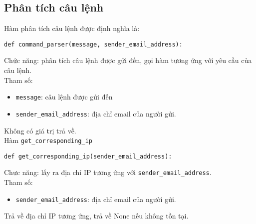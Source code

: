 \subsection{Phân tích câu lệnh}
Hàm phân tích câu lệnh được định nghĩa là:
\begin{lstlisting}
def command_parser(message, sender_email_address):
\end{lstlisting}
Chức năng: phân tích câu lệnh được gửi đến, gọi hàm tương ứng với yêu cầu của câu lệnh.\\
Tham số:
\begin{itemize}
\item \lstinline{message}: câu lệnh được gửi đến
\item \lstinline{sender_email_address}: địa chỉ email của người gửi.
\end{itemize}
Không có giá trị trả về.\\

Hàm \lstinline{get_corresponding_ip}
\begin{lstlisting}
def get_corresponding_ip(sender_email_address):
\end{lstlisting}
Chưc năng: lấy ra địa chỉ IP tương ứng với \lstinline{sender_email_address}.\\
Tham số:
\begin{itemize}
\item \lstinline{sender_email_address}: địa chỉ email của người gửi.
\end{itemize}
Trả về địa chỉ IP tương ứng, trả về None nếu không tồn tại.